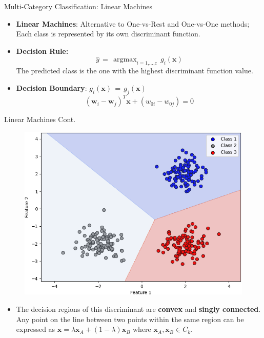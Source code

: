 \documentclass[serif, aspectratio=169]{beamer}
\DeclareMathOperator*{\argmax}{argmax}
\begin{document}
\begin{frame}{Multi-Category Classification: Linear Machines}
    \begin{itemize}\itemsep1.5em
        \item \justifying \textbf{Linear Machines}: Alternative to One-vs-Rest and One-vs-One methods; 
        Each class is represented by its own discriminant function.
        \item \justifying \textbf{Decision Rule:} 
        \[\hat{y} \, = \, \argmax_{i=\text{1,...,c}} \, g_i(\mathbf{x})\]
        The predicted class is the one with the highest discriminant function value.
        \item \textbf{Decision Boundary}:
        \(g_i(\mathbf{x}) \, = \, g_j(\mathbf{x})\)
        \[(\mathbf{w}_i - \mathbf{w}_j)^T\mathbf{x} + (w_{0i} - w_{0j}) = 0\]
    \end{itemize}
\end{frame}


\begin{frame}{Linear Machines Cont.}
    \begin{center}
            \begin{figure}
                \includegraphics[width=\textwidth]{pic/Figure_9.png}
            \end{figure}
        \endminipage
    \end{center}
    \hspace{4cm}
    \begin{itemize}\itemsep1.5em
        \item \justifying The decision regions of this discriminant are \textbf{convex} and \textbf{singly connected}. Any point on the line between two points within the same region can be expressed as 
\(
\mathbf{x} = \lambda \mathbf{x}_A + (1 - \lambda) \mathbf{x}_B
\)
where \( \mathbf{x}_A, \mathbf{x}_B \in C_k \).

    \end{itemize}
\end{frame}
\end{document}
